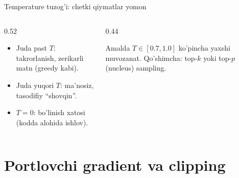 \documentclass[aspectratio=169,11pt]{beamer}
\begin{document}
\begin{frame}{Temperature tuzog'i: chetki qiymatlar yomon}
  \begin{columns}[T]
    \begin{column}{0.52\textwidth}
      \begin{tcolorbox}[warnbox,title=Ikki chekka]
        \small
        \begin{itemize}\setlength\itemsep{2pt}
          \item Juda past $T$: takrorlanish, zerikarli matn (greedy kabi).
          \item Juda yuqori $T$: ma'nosiz, tasodifiy ``shovqin''.
          \item $T{=}0$: bo'linish xatosi (kodda alohida ishlov).
        \end{itemize}
      \end{tcolorbox}
    \end{column}
    \begin{column}{0.44\textwidth}
      \begin{tcolorbox}[okbox,top=2pt,bottom=2pt]
        \footnotesize
        Amalda $T\in[0.7, 1.0]$ ko'pincha yaxshi muvozanat. Qo'shimcha: top-$k$ yoki
        top-$p$ (nucleus) sampling.
      \end{tcolorbox}
    \end{column}
  \end{columns}
\end{frame}

\section[Gradient]{Portlovchi gradient va clipping}
\end{document}
